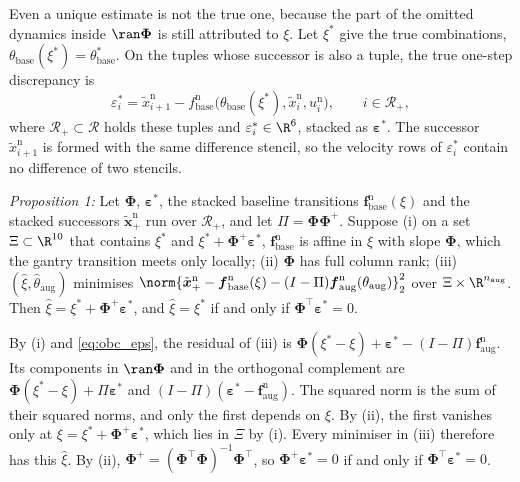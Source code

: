 Even a unique estimate is not the true one, because the part of the omitted
dynamics inside $\ran\boldsymbol\Phi$ is still attributed to $\xi$.
Let $\xi^*$ give the true combinations,
$\theta_{\mathrm{base}}(\xi^*)=\theta^*_{\mathrm{base}}$.
On the tuples whose successor is also a tuple, the true one-step discrepancy
is
\begin{equation}
 \varepsilon^*_i=\tilde x^{\mathrm n}_{i+1}
 -f^{\mathrm n}_{\mathrm{base}}\bigl(\theta_{\mathrm{base}}(\xi^*),
   \tilde x^{\mathrm n}_i,u^{\mathrm n}_i\bigr),
 \qquad i\in\mathcal R_+,
 \label{eq:obc_eps}
\end{equation}
where $\mathcal R_+\subset\mathcal R$ holds these tuples and
$\varepsilon^*_i\in\R^6$, stacked as $\boldsymbol\varepsilon^*$.
The successor $\tilde x^{\mathrm n}_{i+1}$ is formed with the same difference
stencil, so the velocity rows of $\varepsilon^*_i$ contain no difference of
two stencils.

\textit{Proposition 1:} Let $\boldsymbol\Phi$, $\boldsymbol\varepsilon^*$,
the stacked baseline transitions $\boldsymbol f^{\mathrm n}_{\mathrm{base}}(\xi)$
and the stacked successors $\tilde{\boldsymbol x}^{\mathrm n}_{+}$ run over
$\mathcal R_+$, and let $\Pi=\boldsymbol\Phi\boldsymbol\Phi^{+}$.
Suppose
(i) on a set $\Xi\subset\R^{10}$ that contains $\xi^*$ and
$\xi^*+\boldsymbol\Phi^{+}\boldsymbol\varepsilon^*$,
$\boldsymbol f^{\mathrm n}_{\mathrm{base}}$ is affine in $\xi$ with slope
$\boldsymbol\Phi$, which the gantry transition meets only locally;
(ii) $\boldsymbol\Phi$ has full column rank;
(iii) $(\hat\xi,\hat\theta_{\mathrm{aug}})$ minimises
$\norm{\tilde{\boldsymbol x}^{\mathrm n}_{+}
-\boldsymbol f^{\mathrm n}_{\mathrm{base}}(\xi)
-(I-\Pi)\boldsymbol f^{\mathrm n}_{\mathrm{aug}}(\theta_{\mathrm{aug}})}_2^2$
over $\Xi\times\R^{n_{\mathrm{aug}}}$.
Then $\hat\xi=\xi^*+\boldsymbol\Phi^{+}\boldsymbol\varepsilon^*$, and
$\hat\xi=\xi^*$ if and only if
$\boldsymbol\Phi^\top\boldsymbol\varepsilon^*=0$.

\begin{IEEEproof}
By (i) and \eqref{eq:obc_eps}, the residual of (iii) is
$\boldsymbol\Phi(\xi^*-\xi)+\boldsymbol\varepsilon^*
-(I-\Pi)\boldsymbol f^{\mathrm n}_{\mathrm{aug}}$.
Its components in $\ran\boldsymbol\Phi$ and in the orthogonal complement are
$\boldsymbol\Phi(\xi^*-\xi)+\Pi\boldsymbol\varepsilon^*$ and
$(I-\Pi)(\boldsymbol\varepsilon^*-\boldsymbol f^{\mathrm n}_{\mathrm{aug}})$.
The squared norm is the sum of their squared norms, and only the first depends
on $\xi$.
By (ii), the first vanishes only at
$\xi=\xi^*+\boldsymbol\Phi^{+}\boldsymbol\varepsilon^*$, which lies in $\Xi$
by (i).
Every minimiser in (iii) therefore has this $\hat\xi$.
By (ii), $\boldsymbol\Phi^{+}=(\boldsymbol\Phi^\top\boldsymbol\Phi)^{-1}
\boldsymbol\Phi^\top$, so $\boldsymbol\Phi^{+}\boldsymbol\varepsilon^*=0$ if
and only if $\boldsymbol\Phi^\top\boldsymbol\varepsilon^*=0$.
\end{IEEEproof}

